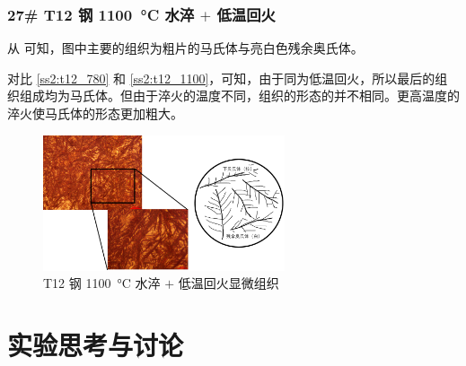 \documentclass[a4paper,utf8]{article}
\begin{document}
        \subsubsection{27# T12 钢 \SI{1100}{\degreeCelsius} 水淬 $+$ 低温回火\label{ss2:t12_1100}}
            从 可知，图中主要的组织为粗片的马氏体与亮白色残余奥氏体。\par
            对比 \ref{ss2:t12_780} 和 \ref{ss2:t12_1100}，可知，由于同为低温回火，所以最后的组织组成均为马氏体。但由于淬火的温度不同，组织的形态的并不相同。更高温度的淬火使马氏体的形态更加粗大。
            \begin{figure}[!ht]
                \includegraphics[height=40mm]{result/14.pdf}
                \caption{T12 钢 \SI{1100}{\degreeCelsius} 水淬 $+$ 低温回火显微组织\label{fig:14}}
            \end{figure}
\section{实验思考与讨论}
\end{document}
